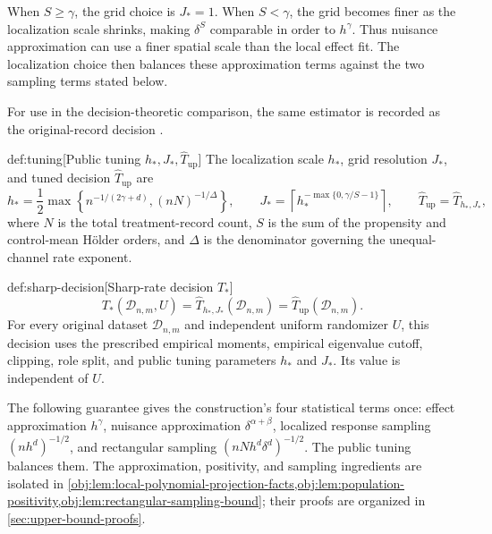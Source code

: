 When \(S\ge\gamma\), the grid choice is \(J_*=1\). When \(S<\gamma\), the grid becomes finer as the localization scale shrinks, making \(\delta^S\) comparable in order to \(h^\gamma\). Thus nuisance approximation can use a finer spatial scale than the local effect fit. The localization choice then balances these approximation terms against the two sampling terms stated below.

For use in the decision-theoretic comparison, the same estimator is recorded as the original-record decision .

\begin{definitionv}{def:tuning}[Public tuning \(h_*,J_*,\widehat T_{\mathrm{up}}\)]
The localization scale \(h_*\), grid resolution \(J_*\), and tuned decision \(\widehat T_{\mathrm{up}}\) are
\[
h_*=\frac12\max\left\{n^{-1/(2\gamma+d)},(nN)^{-1/\Delta}\right\},
\qquad
J_*=\left\lceil h_*^{-\max\{0,\gamma/S-1\}}\right\rceil,
\qquad
\widehat T_{\mathrm{up}}=\widehat T_{h_*,J_*},
\]
where \(N\) is the total treatment-record count, \(S\) is the sum of the propensity and control-mean Hölder orders, and \(\Delta\) is the denominator governing the unequal-channel rate exponent.
\end{definitionv}

\begin{definitionv}{def:sharp-decision}[Sharp-rate decision \(T_*\)]
\[
T_*(\mathcal D_{n,m},U)
=\widehat T_{h_*,J_*}(\mathcal D_{n,m})
=\widehat T_{\mathrm{up}}(\mathcal D_{n,m}).
\]
For every original dataset \(\mathcal D_{n,m}\) and independent uniform randomizer \(U\), this decision uses the prescribed empirical moments, empirical eigenvalue cutoff, clipping, role split, and public tuning parameters \(h_*\) and \(J_*\). Its value is independent of \(U\).
\end{definitionv}

The following guarantee gives the construction's four statistical terms once: effect approximation \(h^\gamma\), nuisance approximation \(\delta^{\alpha+\beta}\), localized response sampling \((nh^d)^{-1/2}\), and rectangular sampling \((nNh^d\delta^d)^{-1/2}\). The public tuning balances them. The approximation, positivity, and sampling ingredients are isolated in \cref{obj:lem:local-polynomial-projection-facts,obj:lem:population-positivity,obj:lem:rectangular-sampling-bound}; their proofs are organized in \cref{sec:upper-bound-proofs}.

